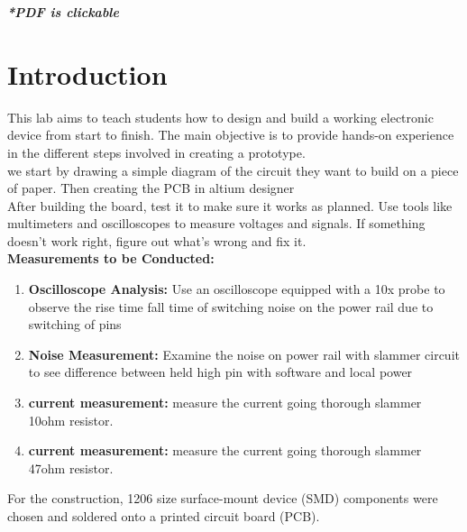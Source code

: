 \documentclass[a4paper,11pt]{article}%
\begin{document}


\pagebreak

\tableofcontents
\listoffigures
\listoftables
\vfill
\begin{center}
	\textbf{\textit{*PDF is clickable}}
\end{center}

\pagebreak

\section{Introduction}


This lab aims to teach students how to design and build a working electronic device from start to finish. The main objective is to provide hands-on experience in the different steps involved in creating a prototype.\\

we start by drawing a simple diagram of the circuit they want to build on a piece of paper. Then creating the PCB in altium designer\\

After building the board, test it to make sure it works as planned. Use tools like multimeters and oscilloscopes to measure voltages and signals. If something doesn't work right, figure out what's wrong and fix it.\\

\textbf{Measurements to be Conducted:}

\begin{enumerate}
	\item \textbf{Oscilloscope Analysis:} Use an oscilloscope equipped with a 10x probe to observe the rise time fall time of switching noise on the power rail due to switching of pins
	\item \textbf{Noise Measurement:} Examine the noise on power rail with slammer circuit to see difference between held high pin with software and local power
	\item \textbf{current measurement:} measure the current going thorough slammer 10ohm resistor.
	\item \textbf{current measurement:} measure the current going thorough slammer 47ohm resistor.
\end{enumerate}

For the construction, 1206 size surface-mount device (SMD) components were chosen and soldered onto a printed circuit board (PCB).
\end{document}
